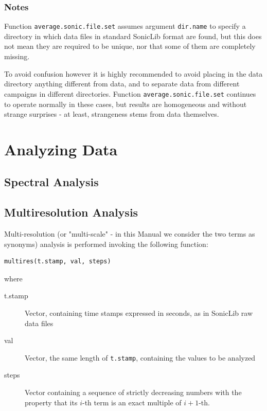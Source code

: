 \documentclass[a4paper,10pt]{book}
\begin{document}
\subsection{Notes}

Function \verb|average.sonic.file.set| assumes argument \verb|dir.name| to specify a directory in which data files in standard SonicLib format are found, but this does not mean they are required to be unique, nor that some of them are completely missing.

To avoid confusion however it is highly recommended to avoid placing in the data directory anything different from data, and to separate data from different campaigns in different directories. Function \verb|average.sonic.file.set| continues to operate normally in these cases, but results are homogeneous and without strange surprises - at least, strangeness stems from data themselves.

\chapter{Analyzing Data}
\label{chap:Data Analysis}

\section{Spectral Analysis}
\label{sec:Spectral_Analysis}

\section{Multiresolution Analysis}
\label{sec:Multires_Analysis}

Multi-resolution (or "multi-scale" - in this Manual we consider the two terms as synonyms) analysis is performed invoking the following function:

\begin{verbatim}
multires(t.stamp, val, steps)
\end{verbatim}

\noindent where

\begin{description}
\item[t.stamp] Vector, containing time stamps expressed in seconds, as in SonicLib raw data files
\item[val] Vector, the same length of \verb|t.stamp|, containing the values to be analyzed
\item[steps] Vector containing a sequence of strictly decreasing numbers with the property that its $i$-th term is an exact multiple of $i+1$-th.
\end{description}
\end{document}
